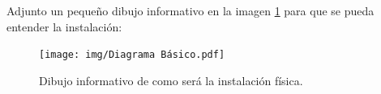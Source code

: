 \begin{itemize}
Adjunto un pequeño dibujo informativo en la imagen \ref{Img:DiagramaBasico} para que se pueda entender la instalación:

\begin{figure}
    \centering
    \texttt{[image: img/Diagrama Básico.pdf]}
    \caption{Dibujo informativo de como será la instalación física.} \label{Img:DiagramaBasico}
\end{figure}

\end{itemize}

